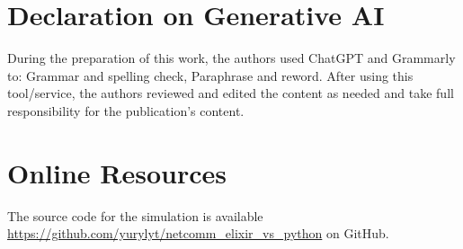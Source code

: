 \documentclass[
]{ceurart}
\begin{document}
\section*{Declaration on Generative AI}  
 During the preparation of this work, the authors used ChatGPT and Grammarly to: Grammar and spelling check, Paraphrase and reword. After using this tool/service, the authors reviewed and edited the content as needed and take full responsibility for the publication’s content.



\appendix

\section{Online Resources}
The source code for the simulation is available \url{https://github.com/yurylyt/netcomm_elixir_vs_python} on GitHub. 
\end{document}
